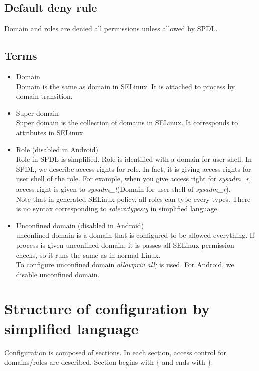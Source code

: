 \documentclass{article}
\begin{document}
\subsection{Default deny rule}
Domain and roles are denied all permissions unless allowed by SPDL.

\subsection{Terms}
\begin{itemize}
\item Domain \\
 Domain is the same as domain in SELinux. It is attached to process by domain 
 transition.
\item Super domain\\
 Super domain is the collection of domains in SELinux. It corresponds to 
 attributes in SELinux.
\item Role (disabled in Android)\\
 Role in SPDL is simplified. Role is identified
      with a domain for user shell. In SPDL, we describe access
      rights for role. In fact, it is giving access rights for user
      shell of the role. For example, when you give access right for
      {\it sysadm\_r}, access right is given to 
{\it sysadm\_t}(Domain for user shell of {\it sysadm\_r}).\\
 Note that in generated SELinux policy, all roles can type every types.
      There is no syntax corresponding to {\it role:x:types:y} in
      simplified language.
\item Unconfined domain (disabled in Android)\\
unconfined domain is a domain that is configured to be allowed
      everything. If process is given unconfined domain, it is passes
      all SELinux permission checks, so it runs the same as in normal Linux.\\

To configure unconfined domain {\it allowpriv all;} is used. For Android, we 
disable unconfined domain.
\end{itemize}                  

\section{Structure of configuration by simplified language}
Configuration is composed of sections. In each section, access control for domains/roles are described. Section begins with $\{$ and ends with $\}$. 
\end{document}

